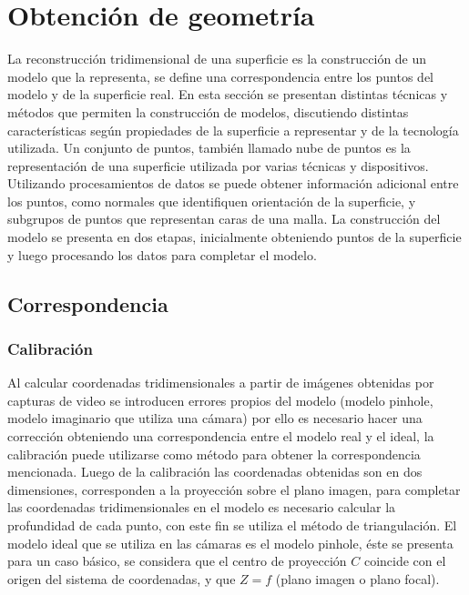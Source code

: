 ﻿\chapter{Obtención de geometría}

La reconstrucción tridimensional de una superficie es la construcción de un modelo que la representa, se define una correspondencia entre los puntos del modelo y de la superficie real. En esta sección se presentan distintas técnicas y métodos que permiten la construcción de modelos, discutiendo distintas características según propiedades de la superficie a representar y de la tecnología utilizada. Un conjunto de puntos, también llamado nube de puntos  es la representación de una superficie utilizada por varias técnicas y dispositivos. Utilizando procesamientos de datos se puede obtener información adicional entre los puntos, como normales que identifiquen orientación de la superficie, y subgrupos de puntos que representan caras de una malla. La construcción del modelo se presenta en dos etapas, inicialmente obteniendo puntos de la superficie y luego procesando los datos para completar el modelo.

\section{Correspondencia}

\subsection{Calibración}

Al calcular coordenadas tridimensionales a partir de imágenes obtenidas por capturas de video se introducen errores propios del modelo (modelo pinhole, modelo imaginario que utiliza una cámara) por ello es necesario hacer una corrección obteniendo una correspondencia entre el modelo real y el ideal, la calibración puede utilizarse como método para obtener la correspondencia mencionada. Luego de la calibración las coordenadas obtenidas son en dos dimensiones, corresponden a la proyección sobre el plano imagen, para completar las coordenadas tridimensionales en el modelo es necesario calcular la profundidad de cada punto, con este fin se utiliza el método de triangulación. El modelo ideal que se utiliza en las cámaras es el modelo pinhole, éste se presenta para un caso básico, se considera que el centro de proyección $C$ coincide con el origen del sistema de coordenadas, y que $Z = f$ (plano imagen o plano focal).

